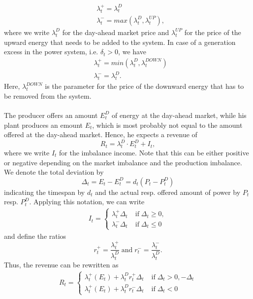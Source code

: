 \begin{align*}
	&\lambda_{t}^{+}=\lambda_{t}^{D}
	\\ &\lambda_{t}^{-}=max\left(\lambda_{t}^{D}, \lambda_{t}^{UP}\right),
\end{align*}
where we write $\lambda_{t}^{D}$ for the day-ahead market price and $\lambda_{t}^{UP}$ for the price of the upward energy that needs to be added to the system. In case of a generation excess in the power system, i.e. $\delta_{t}>0$, we have 
\begin{align*}
	&\lambda_{t}^{+}=min\left(\lambda_{t}^{D}, \lambda_{t}^{DOWN}\right)
	\\ &\lambda_{t}^{-}=\lambda_{t}^{D}.
\end{align*} 
Here, $\lambda_{t}^{DOWN}$ is the parameter for the price of the downward energy that has to be removed from the system. 
\\ \\
The producer offers an amount $E_{t}^{D}$ of energy at the day-ahead market, while his plant produces an emount $E_{t}$, which is most probably not equal to the amount offered at the day-ahead market. Hence, he expects a revenue of
\begin{equation*}
	R_{t}=\lambda_{t}^{D}\cdot E_{t}^{D} + I_{t},
\end{equation*}
where we write $I_{t}$ for the imbalance income. Note that this can be either positive or negative depending on the market imbalance and the production imbalance. We denote the total deviation by
\begin{equation*}
	\Delta_{t}=E_{t}-E_{t}^{D}=d_{t}\left(P_{t}-P_{t}^{D}\right)
\end{equation*}
indicating the timespan by $d_{t}$ and the actual resp. offered amount of power by $P_{t}$ resp. $P_{t}^{D}$. Applying this notation, we can write
\begin{align*}
	I_{t}= \begin{cases}
		\lambda_{t}^{+}\Delta_{t} &\mathrm{\; if \;} \Delta_{t} \geq 0,
		\\ \lambda_{t}^{-}\Delta_{t} &\mathrm{\; if \;} \Delta_{t}\leq 0
	\end{cases}
\end{align*}
and define the ratios 
\begin{equation*}
	r_{t}^{+}= \frac{\lambda_{t}^{+}}{\lambda_{t}^{D}} \mathrm{\; and \;} r_{t}^{-}=\frac{\lambda_{t}^{-}}{\lambda_{t}^{D}}.
\end{equation*}
Thus, the revenue can be rewritten as
\begin{align*}
	R_{t}= \begin{cases}
		\lambda_{t}^{+}\left(E_{t}\right)+\lambda_{t}^{D}r_{t}^	{+}\Delta_{t} &\mathrm{\; if \;} \Delta_{t} > 0,-\Delta_{t}
		\\ \lambda_{t}^{+}\left(E_{t}\right)+\lambda_{t}^{D}r_{t}^	{-}\Delta_{t} &\mathrm{\; if \;} \Delta_{t}< 0
	\end{cases}
\end{align*} 
